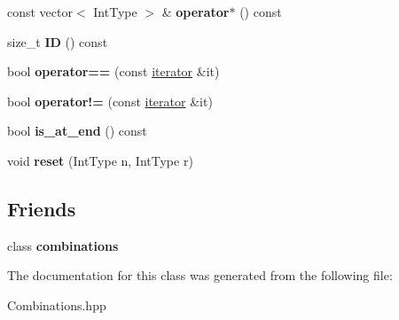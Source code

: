 \begin{DoxyCompactItemize}
\item 
\hypertarget{classdis_1_1combinations_1_1iterator_a472eac7a2a26b7e44cc99a9de4d94447}{const vector$<$ Int\-Type $>$ \& {\bfseries operator$\ast$} () const }\label{classdis_1_1combinations_1_1iterator_a472eac7a2a26b7e44cc99a9de4d94447}

\item 
\hypertarget{classdis_1_1combinations_1_1iterator_a70aec10ba480350d2a39c12fb938d68f}{size\-\_\-t {\bfseries I\-D} () const }\label{classdis_1_1combinations_1_1iterator_a70aec10ba480350d2a39c12fb938d68f}

\item 
\hypertarget{classdis_1_1combinations_1_1iterator_afc155982971349e979fab93d561f6441}{bool {\bfseries operator==} (const \hyperlink{classdis_1_1combinations_1_1iterator}{iterator} \&it)}\label{classdis_1_1combinations_1_1iterator_afc155982971349e979fab93d561f6441}

\item 
\hypertarget{classdis_1_1combinations_1_1iterator_a22c9a468d85cbd65acbeb002f3283d7f}{bool {\bfseries operator!=} (const \hyperlink{classdis_1_1combinations_1_1iterator}{iterator} \&it)}\label{classdis_1_1combinations_1_1iterator_a22c9a468d85cbd65acbeb002f3283d7f}

\item 
\hypertarget{classdis_1_1combinations_1_1iterator_adb4b2ba2c68ba8302e165f20f8ced028}{bool {\bfseries is\-\_\-at\-\_\-end} () const }\label{classdis_1_1combinations_1_1iterator_adb4b2ba2c68ba8302e165f20f8ced028}

\item 
\hypertarget{classdis_1_1combinations_1_1iterator_aa07b7cf6ec78f5d4a45667e75c669c8e}{void {\bfseries reset} (Int\-Type n, Int\-Type r)}\label{classdis_1_1combinations_1_1iterator_aa07b7cf6ec78f5d4a45667e75c669c8e}

\end{DoxyCompactItemize}
\subsection*{Friends}
\begin{DoxyCompactItemize}
\item 
\hypertarget{classdis_1_1combinations_1_1iterator_adc2658f7c28b0f0d385cacfa66937711}{class {\bfseries combinations}}\label{classdis_1_1combinations_1_1iterator_adc2658f7c28b0f0d385cacfa66937711}

\end{DoxyCompactItemize}


The documentation for this class was generated from the following file\-:\begin{DoxyCompactItemize}
\item 
Combinations.\-hpp\end{DoxyCompactItemize}

